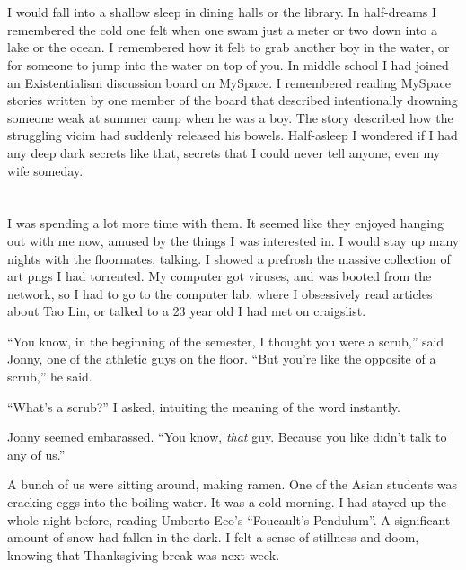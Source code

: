 \section{}

I would fall into a shallow sleep in dining halls or the library.  In
half-dreams I remembered the cold one felt when one swam just a meter or two
down into a lake or the ocean.  I remembered how it felt to grab another boy in
the water, or for someone to jump into the water on top of you.  In middle
school I had joined an Existentialism discussion board on MySpace.  I remembered
reading MySpace stories written by one member of the board that described
intentionally drowning someone weak at summer camp when he was a boy.  The story
described how the struggling vicim had suddenly released his bowels.
Half-asleep I wondered if I had any deep dark secrets like that, secrets that I
could never tell anyone, even my wife someday.


\section{}


I was spending a lot more time with them.  It seemed like they enjoyed hanging
out with me now, amused by the things I was interested in.  I would stay up many
nights with the floormates, talking.  I showed a prefrosh the massive collection of
art pngs I had torrented.  My computer got viruses, and was booted from the
network, so I had to go to the computer lab, where I obsessively read articles
about Tao Lin, or talked to a 23 year old I had met on craigslist.  

``You know, in the beginning of the semester, I thought you were a scrub,'' said
Jonny, one of the athletic guys on the floor.  ``But you're like the opposite of
a scrub,'' he said.  

``What's a scrub?''  I asked, intuiting the meaning of the word instantly.

Jonny seemed embarassed.  ``You know, \textit{that} guy.  Because you like
didn't talk to any of us.''  

A bunch of us were sitting around, making ramen.  One of the Asian students was
cracking eggs into the boiling water.  It was a cold morning.  I had stayed up
the whole night before, reading Umberto Eco's ``Foucault's Pendulum''.  A
significant amount of snow had fallen in the dark.  I felt a sense of stillness
and doom, knowing that Thanksgiving break was next week.


